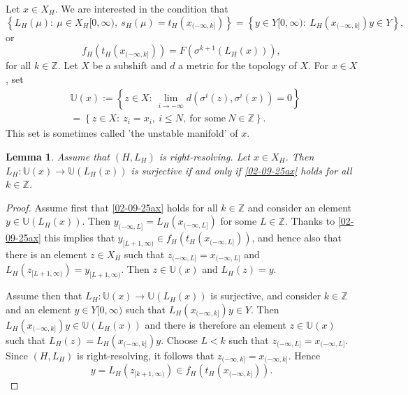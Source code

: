 \documentclass[12pt,oneside,english]{amsart}
\newtheorem{lemma}[thm]{Lemma}
\begin{document}
Let $x \in X_H$. We are interested in the condition that 
\begin{equation}\label{02-09-25ax}
\left\{ L_H(\mu) : \ \mu \in X_H[0,\infty), \ s_H(\mu)  = 
t_H(x_{(-\infty, k]})\right\} = \left\{ y \in Y[0,\infty): \ L_H(x_{(-\infty,k]})y \in Y \right\}, 
\end{equation}
or 
\begin{equation}\label{23-09-25}
f_H(t_H(x_{(-\infty,k]})) = F(\sigma^{k+1}(L_H(x))),
\end{equation}
for all $k \in \mathbb Z$. Let $X$ be a subshift and $d$ a metric for the topology of $X$. For $x \in X$, set 
\begin{align*}
&\mathbb U(x) := \left\{ z \in X: \ \lim_{i \to - \infty} d\left(\sigma^i(z),\sigma^i(x)\right) = 0\right\} \\
&= \left\{z \in X: \ z_i = x_i, \ i \leq N, \ \text{for some} \ N \in \mathbb Z \right\} .
\end{align*} 
This set is sometimes called 'the unstable manifold' of $x$.

\begin{lemma}\label{02-09-25x}  Assume that $(H,L_H)$ is right-resolving. Let $x \in X_H$. Then $L_H : \mathbb U(x) \to \mathbb U(L_H(x))$ is surjective if and only if \eqref{02-09-25ax} holds for all $k \in \mathbb Z$.




\end{lemma}
\begin{proof} 

 Assume first that \eqref{02-09-25ax} holds for all $k \in \mathbb Z$ and consider an element $y \in \mathbb U(L_H(x))$. Then $y_{(-\infty,L]} = L_H(x_{(-\infty,L]})$ for some $L \in \mathbb Z$. Thanks to \eqref{02-09-25ax} this implies that $y_{[L+1,\infty)} \in f_H(t_H(x_{(-\infty,L]}))$, and hence also that there is an element $z \in X_H$ such that $z_{(-\infty,L]} = x_{(-\infty,L]}$ and $L_H(z_{[L+1,\infty)}) = y_{[L+1,\infty)}$. Then $z \in \mathbb U(x)$ and $L_H(z) = y$.

Assume then that $L_H : \mathbb U(x) \to \mathbb U(L_H(x))$ is surjective, and consider $k \in \mathbb Z$ and an element $y\in Y[0,\infty)$ such that $L_H(x_{(-\infty,k]})y \in Y$. Then $L_H(x_{(-\infty,k]})y \in \mathbb U(L_H(x))$ and there is therefore an element $z \in \mathbb U(x)$ such that $L_H(z) =L_H(x_{(-\infty,k]})y$. Choose $L < k$ such that $z_{(-\infty, L]} = x_{(-\infty, L]}$. Since $(H,L_H)$ is right-resolving, it follows that $z_{(-\infty, k]} = x_{(-\infty, k]}$. Hence 
$$
y = L_H(z_{[k+1,\infty)}) \in f_H(t_H(x_{(-\infty,k]})).
$$

\end{proof}
\end{document}

